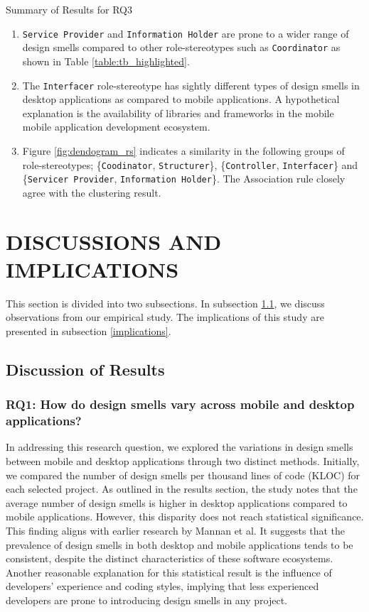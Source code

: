 \documentclass[AMA,Times1COL]{WileyNJDv5} %
\begin{document}
		\begin{boxwithhead}
		{Summary of Results for RQ3}
		{\noindent 
			\begin{enumerate}
				\item \texttt{Service Provider} and \texttt{Information Holder} are prone to a wider range of design smells compared to other role-stereotypes such as \texttt{Coordinator} as shown in Table \ref{table:tb_highlighted}. 
				\item The \texttt{Interfacer} role-stereotype has sightly different types of design smells in desktop applications as compared to mobile applications. A hypothetical explanation is the availability of libraries and frameworks in the mobile mobile application development ecosystem.
				\item Figure \ref{fig:dendogram_rs} indicates a similarity in the following groups of role-stereotypes; \{\texttt{Coodinator}, \texttt{Structurer}\}, 
				\{\texttt{Controller}, \texttt{Interfacer}\} and 
				\{\texttt{Servicer Provider}, \texttt{Information Holder}\}. The Association rule closely agree with the clustering result.
			\end{enumerate}
		}
	\end{boxwithhead}
	
	
	
	\section{DISCUSSIONS AND IMPLICATIONS}\label{sec:ds_imp}
	This section is divided into two subsections. In subsection \ref{discussion}, we discuss observations from our empirical study. The implications of this study are presented in subsection \ref{implications}.
	\subsection{Discussion of Results} \label{discussion}
	\subsubsection*{RQ1: How do design smells vary across mobile and desktop applications?}
	In addressing this research question, we explored the variations in design smells between mobile and desktop applications through two distinct methods. Initially, we compared the number of design smells per thousand lines of code (KLOC) for each selected project. As outlined in the results section, the study notes that the average number of design smells is higher in desktop applications compared to mobile applications. However, this disparity does not reach statistical significance. This finding aligns with earlier research by Mannan et al\cite{mannan2016understanding}. It suggests that the prevalence of design smells in both desktop and mobile applications tends to be consistent, despite the distinct characteristics of these software ecosystems. Another reasonable explanation for this statistical result is the influence of developers' experience and coding styles, implying that less experienced developers are prone to introducing design smells in any project.
	
\end{document}
